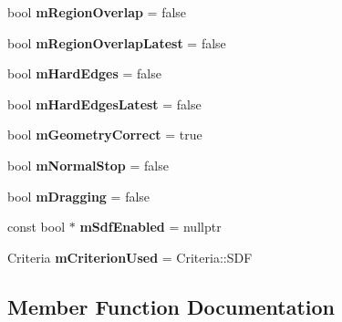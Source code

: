 \begin{DoxyCompactItemize}
bool {\bfseries m\+Region\+Overlap} = false
\item 
\mbox{\label{classpepr3d_1_1_semiautomatic_segmentation_a891511ae4a879017f2b41f7ea60ea00d}} 
bool {\bfseries m\+Region\+Overlap\+Latest} = false
\item 
\mbox{\label{classpepr3d_1_1_semiautomatic_segmentation_a36fe1e14da326441541dae71813efcbd}} 
bool {\bfseries m\+Hard\+Edges} = false
\item 
\mbox{\label{classpepr3d_1_1_semiautomatic_segmentation_a6a66c343b795f12b6e0ce2da9348a114}} 
bool {\bfseries m\+Hard\+Edges\+Latest} = false
\item 
\mbox{\label{classpepr3d_1_1_semiautomatic_segmentation_a66acd079f9745d4256ab565875a16467}} 
bool {\bfseries m\+Geometry\+Correct} = true
\item 
\mbox{\label{classpepr3d_1_1_semiautomatic_segmentation_a9241c976815c903667d695474f800ed7}} 
bool {\bfseries m\+Normal\+Stop} = false
\item 
\mbox{\label{classpepr3d_1_1_semiautomatic_segmentation_aaf38b8e2bd48df516e2dc85bc96255d8}} 
bool {\bfseries m\+Dragging} = false
\item 
\mbox{\label{classpepr3d_1_1_semiautomatic_segmentation_a54b1b6bd1dc72e3e2c8705fc40d8bd24}} 
const bool $\ast$ {\bfseries m\+Sdf\+Enabled} = nullptr
\item 
\mbox{\label{classpepr3d_1_1_semiautomatic_segmentation_aa313797e5f5f5650463d9c5423a5f8a6}} 
Criteria {\bfseries m\+Criterion\+Used} = Criteria\+::\+S\+DF
\end{DoxyCompactItemize}


\subsection{Member Function Documentation}
\mbox{\label{classpepr3d_1_1_semiautomatic_segmentation_a163c52c9b1e672ba76141923ab87eb0a}} 
